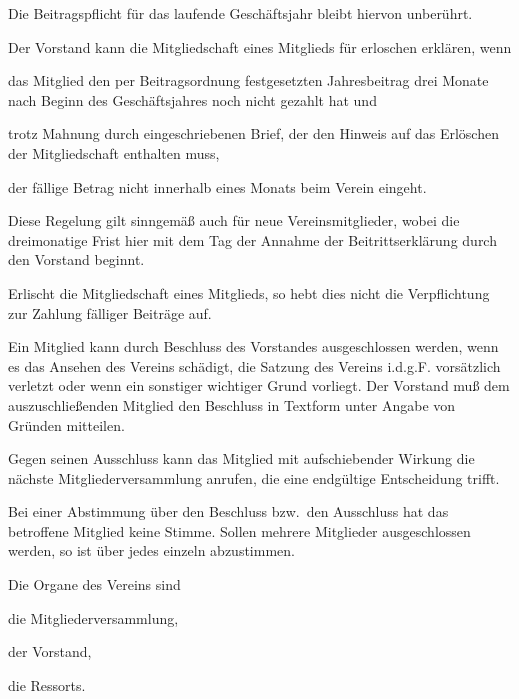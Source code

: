 \documentclass[draft]{scrartcl}
\begin{document}
\begin{contract}
Die Beitragspflicht für das laufende Geschäftsjahr bleibt hiervon unberührt.

Der Vorstand kann die Mitgliedschaft eines Mitglieds für erloschen erklären, wenn

\begin{compactitem}
  \item das Mitglied den per Beitragsordnung festgesetzten Jahresbeitrag
  drei Monate nach Beginn des Geschäftsjahres noch nicht gezahlt hat und
  \item trotz Mahnung durch eingeschriebenen Brief, der den Hinweis auf
  das Erlöschen der Mitgliedschaft enthalten muss,
  \item der fällige Betrag nicht innerhalb eines Monats beim Verein
  eingeht.
\end{compactitem}

Diese Regelung gilt sinngemäß auch für neue Vereinsmitglieder, wobei die
dreimonatige Frist hier mit dem Tag der Annahme der Beitrittserklärung
durch den Vorstand beginnt.

Erlischt die Mitgliedschaft eines Mitglieds, so hebt dies nicht die
Verpflichtung zur Zahlung fälliger Beiträge auf.


Ein Mitglied kann durch Beschluss des Vorstandes ausgeschlossen werden, wenn es
das Ansehen des Vereins schädigt, die Satzung des Vereins i.d.g.F. vorsätzlich
verletzt oder wenn ein sonstiger wichtiger Grund vorliegt. Der Vorstand muß
dem auszuschließenden Mitglied den Beschluss in Textform unter Angabe von Gründen
mitteilen.

Gegen seinen Ausschluss kann das Mitglied mit aufschiebender Wirkung die nächste
Mitgliederversammlung anrufen, die eine endgültige Entscheidung trifft.

Bei einer Abstimmung über den Beschluss bzw.\ den Ausschluss hat das betroffene
Mitglied keine Stimme. Sollen mehrere Mitglieder ausgeschlossen werden, so ist
über jedes einzeln abzustimmen.


Die Organe des Vereins sind

\begin{compactenum}[\hspace{2em}1.]
  \item die Mitgliederversammlung,
  \item der Vorstand,
  \item die Ressorts.
\end{compactenum}


\end{contract}
\end{document}
